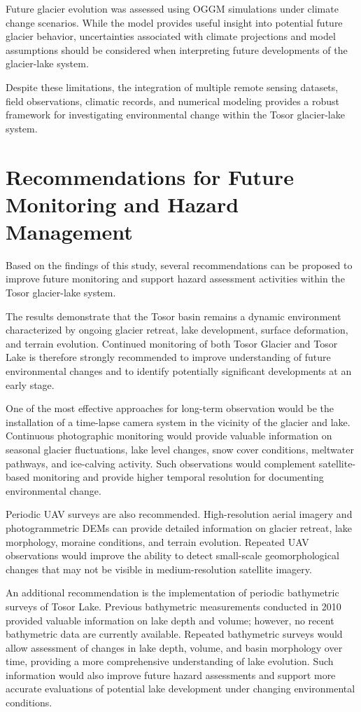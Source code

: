 \documentclass[12pt,a4paper]{report}
\begin{document}
Future glacier evolution was assessed using OGGM simulations under climate change scenarios. While the model provides useful insight into potential future glacier behavior, uncertainties associated with climate projections and model assumptions should be considered when interpreting future developments of the glacier-lake system.

Despite these limitations, the integration of multiple remote sensing datasets, field observations, climatic records, and numerical modeling provides a robust framework for investigating environmental change within the Tosor glacier-lake system.

\section{Recommendations for Future Monitoring and Hazard Management}

Based on the findings of this study, several recommendations can be proposed to improve future monitoring and support hazard assessment activities within the Tosor glacier-lake system.

The results demonstrate that the Tosor basin remains a dynamic environment characterized by ongoing glacier retreat, lake development, surface deformation, and terrain evolution. Continued monitoring of both Tosor Glacier and Tosor Lake is therefore strongly recommended to improve understanding of future environmental changes and to identify potentially significant developments at an early stage.

One of the most effective approaches for long-term observation would be the installation of a time-lapse camera system in the vicinity of the glacier and lake. Continuous photographic monitoring would provide valuable information on seasonal glacier fluctuations, lake level changes, snow cover conditions, meltwater pathways, and ice-calving activity. Such observations would complement satellite-based monitoring and provide higher temporal resolution for documenting environmental change.

Periodic UAV surveys are also recommended. High-resolution aerial imagery and photogrammetric DEMs can provide detailed information on glacier retreat, lake morphology, moraine conditions, and terrain evolution. Repeated UAV observations would improve the ability to detect small-scale geomorphological changes that may not be visible in medium-resolution satellite imagery.

An additional recommendation is the implementation of periodic bathymetric surveys of Tosor Lake. Previous bathymetric measurements conducted in 2010 provided valuable information on lake depth and volume; however, no recent bathymetric data are currently available. Repeated bathymetric surveys would allow assessment of changes in lake depth, volume, and basin morphology over time, providing a more comprehensive understanding of lake evolution. Such information would also improve future hazard assessments and support more accurate evaluations of potential lake development under changing environmental conditions.
\end{document}
